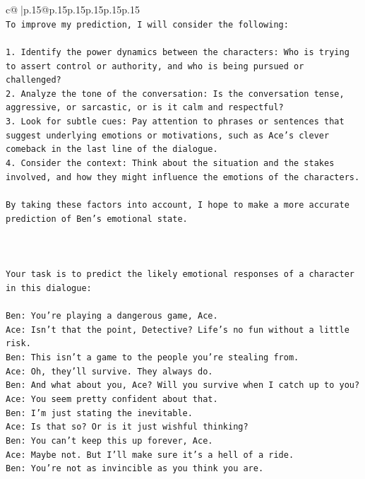 \documentclass{article}
\begin{document}
{\begin{supertabular}{c@{$\;$}|p{.15\linewidth}@{}p{.15\linewidth}p{.15\linewidth}p{.15\linewidth}p{.15\linewidth}p{.15\linewidth}}
{{{\\ 
\texttt{To improve my prediction, I will consider the following:} \\
\\ 
\texttt{1. Identify the power dynamics between the characters: Who is trying to assert control or authority, and who is being pursued or challenged?} \\
\texttt{2. Analyze the tone of the conversation: Is the conversation tense, aggressive, or sarcastic, or is it calm and respectful?} \\
\texttt{3. Look for subtle cues: Pay attention to phrases or sentences that suggest underlying emotions or motivations, such as Ace's clever comeback in the last line of the dialogue.} \\
\texttt{4. Consider the context: Think about the situation and the stakes involved, and how they might influence the emotions of the characters.} \\
\\ 
\texttt{By taking these factors into account, I hope to make a more accurate prediction of Ben's emotional state.} \\
\\ 
\\ 
\\ 
\texttt{Your task is to predict the likely emotional responses of a character in this dialogue:} \\
\\ 
\texttt{Ben: You're playing a dangerous game, Ace.} \\
\texttt{Ace: Isn't that the point, Detective? Life's no fun without a little risk.} \\
\texttt{Ben: This isn't a game to the people you're stealing from.} \\
\texttt{Ace: Oh, they'll survive. They always do.} \\
\texttt{Ben: And what about you, Ace? Will you survive when I catch up to you?} \\
\texttt{Ace: You seem pretty confident about that.} \\
\texttt{Ben: I'm just stating the inevitable.} \\
\texttt{Ace: Is that so? Or is it just wishful thinking?} \\
\texttt{Ben: You can't keep this up forever, Ace.} \\
\texttt{Ace: Maybe not. But I'll make sure it's a hell of a ride.} \\
\texttt{Ben: You're not as invincible as you think you are.} \\
}}}
\end{supertabular}}
\end{document}
